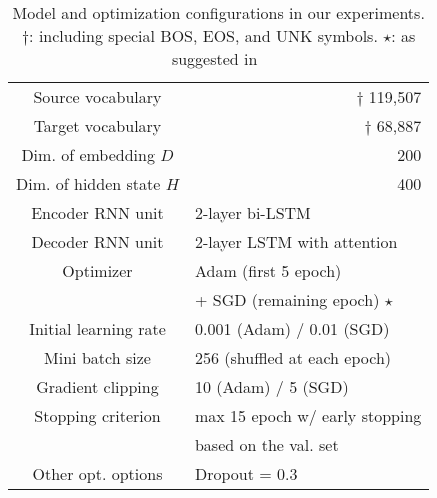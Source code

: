 \documentclass[11pt]{article}
\begin{document}
\begin{table}[t]
 \centering
 \small
 \tabcolsep=4pt
 \begin{tabular}{ c | r || c | r}
\hline 
  Source vocabulary         & \multicolumn{3}{r}{$\dagger$ 119,507} \\
  Target vocabulary         & \multicolumn{3}{r}{$\dagger$  68,887} \\
  Dim. of embedding $D$     & \multicolumn{3}{r}{200}   \\
  Dim. of hidden state $H$  & \multicolumn{3}{r}{400}   \\
  \hline 
  Encoder RNN unit           & \multicolumn{3}{l}{2-layer bi-LSTM} \\
  Decoder RNN unit           & \multicolumn{3}{l}{2-layer LSTM with attention}   \\
   \hline
Optimizer                  & \multicolumn{3}{l}{Adam (first 5 epoch)}\\
  \                          & \multicolumn{3}{l}{+ SGD (remaining epoch) $\star$ }\\
  Initial learning rate      & \multicolumn{3}{l}{0.001 (Adam) / 0.01 (SGD) } \\
  Mini batch size            & \multicolumn{3}{l}{256 (shuffled at each epoch) } \\
  Gradient clipping          & \multicolumn{3}{l}{10 (Adam) / 5 (SGD)}  \\
  Stopping criterion         & \multicolumn{3}{l}{max 15 epoch w/ early stopping}  \\
  \                          & \multicolumn{3}{l}{based on the val. set}  \\
  Other opt. options         & \multicolumn{3}{l}{Dropout = 0.3}               \\
    \hline
 \end{tabular}
 \caption{Model and optimization configurations in our experiments. $\dagger$: including special BOS, EOS, and UNK symbols. $\star$: as suggested in~\cite{DBLP:journals/corr/WuSCLNMKCGMKSJL16} }
  \label{table:configuration}
\end{table}
\end{document}
